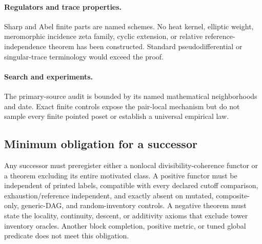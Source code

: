 \paragraph{Regulators and trace properties.}
Sharp and Abel finite parts are named schemes.  No heat kernel, elliptic
weight, meromorphic incidence zeta family, cyclic extension, or relative
reference-independence theorem has been constructed.  Standard
pseudodifferential or singular-trace terminology would exceed the proof.

\paragraph{Search and experiments.}
The primary-source audit is bounded by its named mathematical neighborhoods
and date.  Exact finite controls expose the pair-local mechanism but do not
sample every finite pointed poset or establish a universal empirical law.

\subsection{Minimum obligation for a successor}

Any successor must preregister either a nonlocal divisibility-coherence
functor or a theorem excluding its entire motivated class.  A positive
functor must be independent of printed labels, compatible with every declared
cutoff comparison, exhaustion/reference independent, and exactly absent on
mutated, composite-only, generic-DAG, and random-inventory controls.  A
negative theorem must state the locality, continuity, descent, or additivity
axioms that exclude tower inventory oracles.  Another block completion,
positive metric, or tuned global predicate does not meet this obligation.
